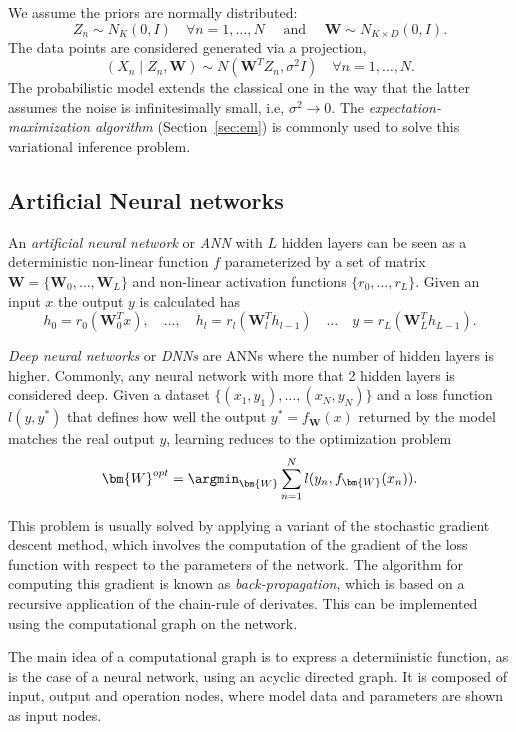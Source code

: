 We assume the priors are normally distributed:
\[
  Z_{n} \sim N_{K}(0, I) \quad \forall n =1,\dots,N \quad \text{ and } \quad \bm{W} \sim N_{K\times D}(0, I).
\]
The data points are considered generated via a projection,
\[
  (X_{n} \mid Z_{n}, \bm{W}) \sim N(\bm{W}^{T}Z_{n}, \sigma^{2}I)\quad \forall n = 1,\dots, N.
\]
The probabilistic model extends the classical one in the way that the latter assumes the noise is infinitesimally small, i.e, \(\sigma^{2} \to 0\). The \emph{expectation-maximization algorithm} (Section~\ref{sec:em}) is commonly used to solve this variational inference problem.



\subsection{Artificial Neural networks}

An \emph{artificial neural network} or \emph{ANN} with \(L\) hidden layers can be seen as a deterministic non-linear function \(f\) parameterized by a set of matrix \(\bm{W} = \{\bm{W}_{0},\dots, \bm{W}_{L}\}\) and non-linear activation functions \(\{r_{0},\dots, r_{L}\}\). Given an input \(x\) the output \(y\) is calculated has
\[
  h_{0} = r_{0}(\bm{W}^{T}_{0}x), \quad \dots, \quad h_{l} = r_{l}(\bm{W}_{l}^{T}h_{l-1}) \quad \dots \quad y = r_{L}(\bm{W}_{L}^{T}h_{L-1}).
\]

\emph{Deep neural networks} or \emph{DNNs} are ANNs where the number of hidden layers is higher. Commonly, any neural network with more that 2 hidden layers is considered deep. Given a dataset \(\{(x_{1}, y_{1}), \dots, (x_{N}, y_{N})\}\) and a loss function \(l(y,y^{*})\) that defines how well the output \(y^{*} = f_{\bm{W}}(x)\)  returned by the model matches the real output \(y\), learning reduces to the optimization problem
\[
  \bm{W}^{opt} = \argmin_{\bm{W}} \sum_{n=1}^{N}l(y_{n}, f_{\bm{W}}(x_{n})).
\]

This problem is usually solved by applying a variant of the stochastic gradient descent method, which involves the computation of the gradient of the loss function with respect to the parameters of the network. The algorithm for computing this gradient is known as \emph{back-propagation}, which is based on a recursive application of the chain-rule of derivates. This can be implemented using the computational graph on the network.

The main idea of a computational graph is to express a deterministic function, as is the case of a neural network, using an acyclic directed graph. It is composed of input, output and operation nodes, where model data and parameters are shown as input nodes.


